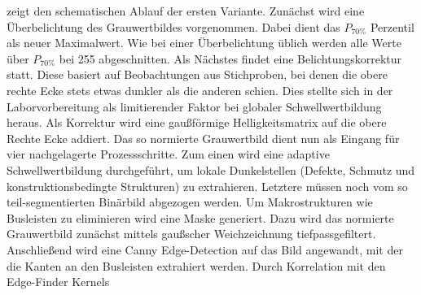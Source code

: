  zeigt den schematischen Ablauf der ersten Variante. Zunächst wird eine Überbelichtung des Grauwertbildes vorgenommen. Dabei dient das \(P_{70\%}\) Perzentil als neuer Maximalwert. Wie bei einer Überbelichtung üblich werden alle Werte über \(P_{70\%}\) bei \num{255} abgeschnitten. Als Nächstes findet eine Belichtungskorrektur statt. Diese basiert auf Beobachtungen aus Stichproben, bei denen die obere rechte Ecke stets etwas dunkler als die anderen schien. Dies stellte sich in der Laborvorbereitung als limitierender Faktor bei globaler Schwellwertbildung heraus. Als Korrektur wird eine gaußförmige Helligkeitsmatrix auf die obere Rechte Ecke addiert. Das so normierte Grauwertbild dient nun als Eingang für vier nachgelagerte Prozessschritte. Zum einen wird eine adaptive Schwellwertbildung durchgeführt, um lokale Dunkelstellen (Defekte, Schmutz und konstruktionsbedingte Strukturen) zu extrahieren. Letztere müssen noch vom so teil-segmentierten Binärbild abgezogen werden. Um Makrostrukturen wie Busleisten zu eliminieren wird eine Maske generiert. Dazu wird das normierte Grauwertbild zunächst mittels gaußscher Weichzeichnung tiefpassgefiltert. Anschließend wird eine \foreignlanguage{english}{Canny Edge-Detection} auf das Bild angewandt, mit der die Kanten an den Busleisten extrahiert werden. Durch Korrelation mit den \foreignlanguage{english}{Edge-Finder} Kernels
%
